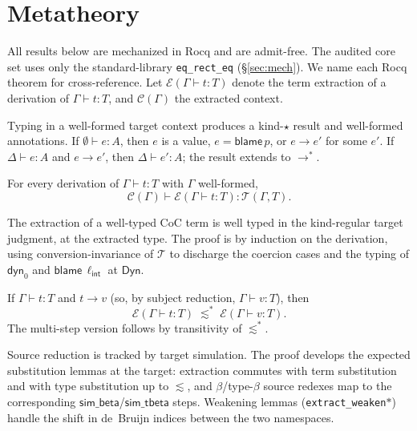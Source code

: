 \documentclass[acmsmall,anonymous=false,nonacm]{acmart}
\newcommand{\dyn}{\ensuremath{\mathsf{Dyn}}}
\newcommand{\kstar}{\ensuremath{\star}}
\newcommand{\blame}[1]{\mathsf{blame}\,#1}
\newcommand{\ext}{\mathcal{E}}
\newcommand{\extt}{\mathcal{T}}
\newcommand{\extc}{\mathcal{C}}
\newcommand{\dyntoken}{\mathsf{dyn}_0}
\newcommand{\lint}{\ell_{\mathsf{int}}}
\newcommand{\reduces}{\longrightarrow}
\newcommand{\reducesstar}{\longrightarrow^{*}}
\newcommand{\sepsim}{\mathrel{\lesssim}}
\newcommand{\hastype}[3]{#1 \vdash #2 : #3}
\begin{document}
\section{Metatheory}\label{sec:metatheory}

All results below are mechanized in Rocq and are admit-free. The audited core
set uses only the standard-library \texttt{eq\_rect\_eq}
(\S\ref{sec:mech}). We name each
Rocq theorem for cross-reference. Let $\ext(\Gamma \vdash t : T)$ denote the
term extraction of a derivation of $\hastype{\Gamma}{t}{T}$, and
$\extc(\Gamma)$ the extracted context.

\begin{theorem}
\label{thm:target-safety}
Typing in a well-formed target context produces a kind-$\kstar$ result and
well-formed annotations. If $\hastype{\emptyset}{e}{A}$, then $e$ is a value,
$e=\blame p$, or $e\reduces e'$ for some $e'$. If
$\hastype{\Delta}{e}{A}$ and $e\reduces e'$, then
$\hastype{\Delta}{e'}{A}$; the result extends to $\reducesstar$.
\end{theorem}

\begin{theorem}
\label{thm:welltyped-extraction}
For every derivation of $\hastype{\Gamma}{t}{T}$ with $\Gamma$ well-formed,
\[
\hastype{\extc(\Gamma)}{\ext(\Gamma \vdash t : T)}{\extt(\Gamma, T)}.
\]
\end{theorem}
The extraction of a well-typed CoC term is well typed in the kind-regular
target judgment, at the extracted type. The proof is by induction on the derivation, using
conversion-invariance of $\extt$ to discharge the coercion cases and the typing
of $\dyntoken$ and $\blame \lint$ at $\dyn$.

\begin{theorem}
\label{thm:sim}
If $\hastype{\Gamma}{t}{T}$ and $t \reduces v$ (so, by subject reduction,
$\hastype{\Gamma}{v}{T}$), then
\[
\ext(\Gamma \vdash t : T) \;\sepsim^{*}\; \ext(\Gamma \vdash v : T).
\]
The multi-step version follows by transitivity of $\sepsim^{*}$.
\end{theorem}
Source reduction is tracked by target simulation. The proof develops the
expected substitution lemmas at the target: extraction commutes with term
substitution and with type substitution up to $\sepsim$, and $\beta$/type-$\beta$
source redexes map to the corresponding $\mathsf{sim\_beta}$/$\mathsf{sim\_tbeta}$
steps. Weakening lemmas (\texttt{extract\_weaken}$\ast$) handle the shift in
de~Bruijn indices between the two namespaces.
\end{document}

